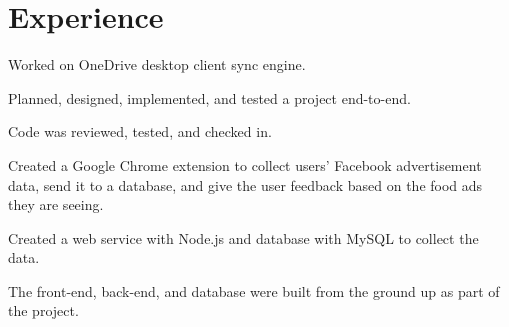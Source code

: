 \documentclass[letterpaper]{deedy-resume} %
\begin{document}
\begin{minipage}[t]{0.655\textwidth} %


\section{Experience}


\vspace{\topsep} %
\begin{tightitemize}
\item Worked on OneDrive desktop client sync engine.
\item Planned, designed, implemented, and tested a project end-to-end.
\item Code was reviewed, tested, and checked in.
\end{tightitemize}

\sectionspace %



\begin{tightitemize}
\item Created a Google Chrome extension to collect users' Facebook advertisement data, send it to a database, and give the user feedback based on the food ads they are seeing.
\item Created a web service with Node.js and database with MySQL to collect the data.
\item The front-end, back-end, and database were built from the ground up as part of the project.
\end{tightitemize}

\sectionspace %

\vspace{-0.5em}

\end{minipage}
\end{document}
